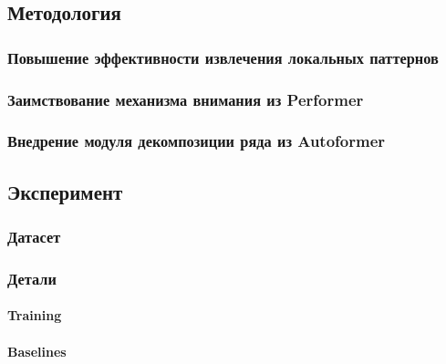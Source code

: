 \subsection{Методология}


\subsubsection{Повышение эффективности извлечения локальных паттернов}


\subsubsection{Заимствование механизма внимания из Performer}


\subsubsection{Внедрение модуля декомпозиции ряда из Autoformer}



\subsection{Эксперимент}

\subsubsection{Датасет}


\subsubsection{Детали}

\paragraph{Training} %
\paragraph{Baselines} %
